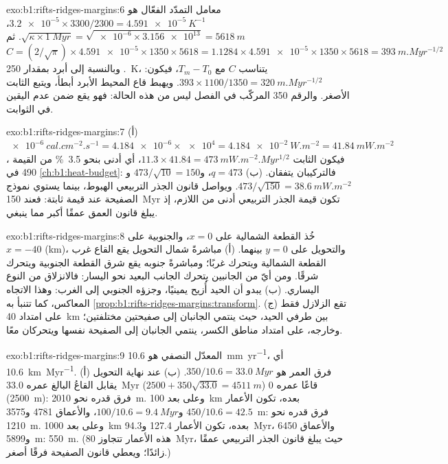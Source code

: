 \begin{solution}{exo:b1:rifts-ridges-margins:6}
معامل التمدّد الفعّال هو
$\num{3.2e-5}\times3300/2300 = \qty{4.591e-5}{K^{-1}}$،
$\sqrt{\kappa\times\qty{1}{Myr}} = \sqrt{\num{e-6}\times\num{3.156e13}} =
\qty{5618}{m}$. ثم $C = (2/\sqrt\pi)\times\num{4.591e-5}\times1350\times5618 =
1.1284\times\num{4.591e-5}\times1350\times5618 = \qty{393}{m.Myr^{-1/2}}$. وبالنسبة إلى  أبرد بمقدار \qty{250}{K}، يتناسب $C$ مع $T_m - T_0$، فيكون:
$393\times1100/1350 = \qty{320}{m.Myr^{-1/2}}$. ويهبط قاع المحيط الأبرد أبطأ، ويتبع الثابت الأصغر. والرقم \num{350} المركّب في الفصل ليس من هذه الحالة: فهو يقع ضمن عدم اليقين في الثوابت.
\end{solution}

\begin{solution}{exo:b1:rifts-ridges-margins:7}
(أ) $\qty{e-6}{cal.cm^{-2}.s^{-1}} = \num{4.184e-6}\times\num{e4} =
\qty{4.184e-2}{W.m^{-2}} = \qty{41.84}{mW.m^{-2}}$، فيكون الثابت $11.3\times41.84 = \qty{473}{mW.m^{-2}.Myr^{1/2}}$، أي أدنى بنحو \qty{3.5}{\percent} من القيمة 490 في \cref{ch:b1:heat-budget}: فالتركيبان يتفقان. (ب) $q = 473$، و$473/\sqrt{10} = 150$ و$473/\sqrt{150} = \qty{38.6}{mW.m^{-2}}$. ويواصل قانون الجذر التربيعي الهبوط، بينما يستوي نموذج الصفيحة عند قيمة ثابتة: فعند \qty{150}{Myr} تكون قيمة الجذر التربيعي أدنى من اللازم، إذ يبلغ قانون العمق عمقًا أكبر مما ينبغي.
\end{solution}

\begin{solution}{exo:b1:rifts-ridges-margins:8}
خُذ القطعة الشمالية على $x = 0$، والجنوبية على $x = -40$ (\unit{km})، والتحويل على $y = 0$ بينهما. (أ) مباشرةً شمال التحويل يقع القاع غرب القطعة الشمالية ويتحرك غربًا؛ ومباشرةً جنوبه يقع شرق القطعة الجنوبية ويتحرك شرقًا. ومن أيّ من الجانبين يتحرك الجانب البعيد نحو اليسار: فالانزلاق من النوع اليساري. (ب) يبدو أن الحيد أُزيح يمينيًا، وجزؤه الجنوبي إلى الغرب: وهذا الاتجاه المعاكس، كما تتنبأ به \cref{prop:b1:rifts-ridges-margins:transform}. (ج) تقع الزلازل فقط على امتداد \qty{40}{km} بين طرفي الحيد، حيث ينتمي الجانبان إلى صفيحتين مختلفتين؛ وخارجه، على امتداد مناطق الكسر، ينتمي الجانبان إلى الصفيحة نفسها ويتحركان معًا.
\end{solution}

\begin{solution}{exo:b1:rifts-ridges-margins:9}
المعدّل النصفي هو \qty{10.6}{mm.yr^{-1}}، أي \qty{10.6}{km.Myr^{-1}}. (أ) فرق العمر هو $350/10.6 = \qty{33.0}{Myr}$. (ب) عند نهاية التحويل يقابل القاعُ البالغ عمره \qty{33.0}{Myr} ($2500 + 350\sqrt{33.0} = \qty{4511}{m}$) قاعًا عمره 0 (\qty{2500}{m}): فرق قدره نحو \qty{2010}{m}. وعلى بعد \qty{100}{km} بعده، تكون الأعمار $450/10.6 = 42.5$ و$100/10.6 = \qty{9.4}{Myr}$، والأعماق 4781 و\qty{3575}{m}: فرق قدره نحو \qty{1210}{m}. وعلى بعد \qty{1000}{km} بعده، تكون الأعمار 127.4 و\qty{94.3}{Myr}، والأعماق 6450 و\qty{5899}{m}: \qty{550}{m}. (هذه الأعمار تتجاوز \qty{80}{Myr}، حيث يبلغ قانون الجذر التربيعي عمقًا زائدًا؛ ويعطي قانون الصفيحة فرقًا أصغر.)
\end{solution}

